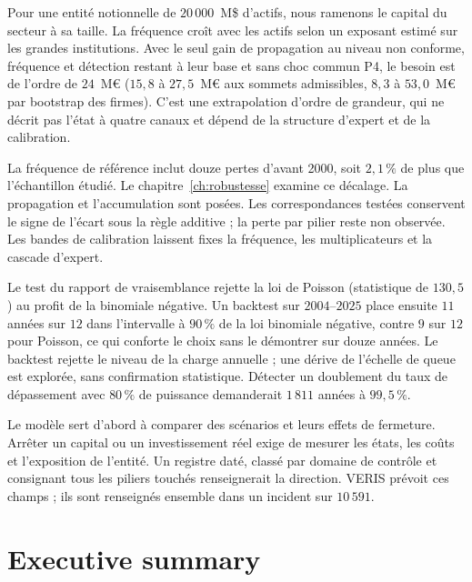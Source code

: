Pour une entité notionnelle de $20\,000$~M\$ d'actifs, nous ramenons le capital du secteur à sa
taille. La fréquence croît avec les actifs selon un exposant estimé sur les grandes institutions.
Avec le seul gain de propagation au niveau non conforme, fréquence et détection restant à leur base et sans choc commun P4, le besoin est de l'ordre de $24$~M\euro{} ($15{,}8$ à $27{,}5$~M\euro{} aux
sommets admissibles, $8{,}3$ à $53{,}0$~M\euro{} par bootstrap des firmes). C'est une extrapolation
d'ordre de grandeur, qui ne décrit pas l'état à quatre canaux et dépend de la structure d'expert et de la calibration.

La fréquence de référence inclut douze pertes d'avant 2000, soit $2{,}1\,\%$ de plus que l'échantillon étudié.
Le chapitre~\ref{ch:robustesse} examine ce décalage.
La propagation et l'accumulation sont posées. Les correspondances testées conservent le signe
de l'écart sous la règle additive ; la perte par pilier reste non observée. Les bandes de calibration
laissent fixes la fréquence, les multiplicateurs et la cascade d'expert.

Le test du rapport de vraisemblance rejette la loi de Poisson (statistique de $130{,}5$) au profit de la
binomiale négative. Un backtest sur $2004$--$2025$ place ensuite $11$
années sur $12$ dans l'intervalle à $90\,\%$ de la loi binomiale négative, contre $9$ sur $12$ pour
Poisson, ce qui conforte le choix sans le démontrer sur douze années. Le backtest rejette le niveau de la charge annuelle ; une dérive de l'échelle de queue est explorée, sans confirmation statistique. Détecter un doublement du taux de dépassement avec $80\,\%$ de puissance demanderait $1\,811$ années à $99{,}5\,\%$.

Le modèle sert d'abord à comparer des scénarios et leurs effets de fermeture. Arrêter un capital
ou un investissement réel exige de mesurer les états, les coûts et l'exposition de l'entité.
Un registre daté, classé par domaine de contrôle et consignant tous les piliers touchés renseignerait
la direction. VERIS prévoit ces champs ; ils sont renseignés ensemble dans un incident sur $10\,591$.


\chapter*{Executive summary}

